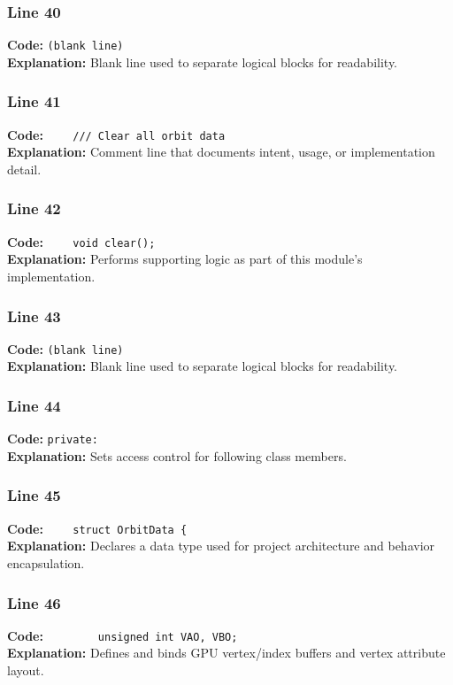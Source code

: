 \documentclass[11pt,a4paper]{article}
\begin{document}
\subsubsection*{Line 40}
\textbf{Code:} \texttt{(blank line)}\\
\textbf{Explanation:} Blank line used to separate logical blocks for readability.

\subsubsection*{Line 41}
\textbf{Code:} \verb|    /// Clear all orbit data|\\
\textbf{Explanation:} Comment line that documents intent, usage, or implementation detail.

\subsubsection*{Line 42}
\textbf{Code:} \verb|    void clear();|\\
\textbf{Explanation:} Performs supporting logic as part of this module's implementation.

\subsubsection*{Line 43}
\textbf{Code:} \texttt{(blank line)}\\
\textbf{Explanation:} Blank line used to separate logical blocks for readability.

\subsubsection*{Line 44}
\textbf{Code:} \verb|private:|\\
\textbf{Explanation:} Sets access control for following class members.

\subsubsection*{Line 45}
\textbf{Code:} \verb|    struct OrbitData {|\\
\textbf{Explanation:} Declares a data type used for project architecture and behavior encapsulation.

\subsubsection*{Line 46}
\textbf{Code:} \verb|        unsigned int VAO, VBO;|\\
\textbf{Explanation:} Defines and binds GPU vertex/index buffers and vertex attribute layout.
\end{document}
